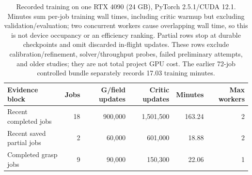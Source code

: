 \begin{table}[H]
\centering\small
\caption{Recorded training on one RTX 4090 (24 GB), PyTorch 2.5.1/CUDA 12.1. Minutes sum per-job training wall times, including critic warmup but excluding validation/evaluation; two concurrent workers cause overlapping wall time, so this is not device occupancy or an efficiency ranking. Partial rows stop at durable checkpoints and omit discarded in-flight updates. These rows exclude calibration/refinement, solver/throughput probes, failed preliminary attempts, and older studies; they are not total project GPU cost. The earlier 72-job controlled bundle separately records 17.03 training minutes.}
\label{tab:current-cost}
\begin{tabular}{@{}lrrrrr@{}}
\toprule
Evidence block & Jobs & G/field updates & Critic updates & Minutes & Max workers \\
\midrule
Recent completed jobs & 18 & 900,000 & 1,501,500 & 163.24 & 2 \\
Recent saved partial jobs & 2 & 60,000 & 601,000 & 18.88 & 2 \\
Completed grasp jobs & 9 & 90,000 & 150,300 & 22.06 & 1 \\
\bottomrule
\end{tabular}
\end{table}
